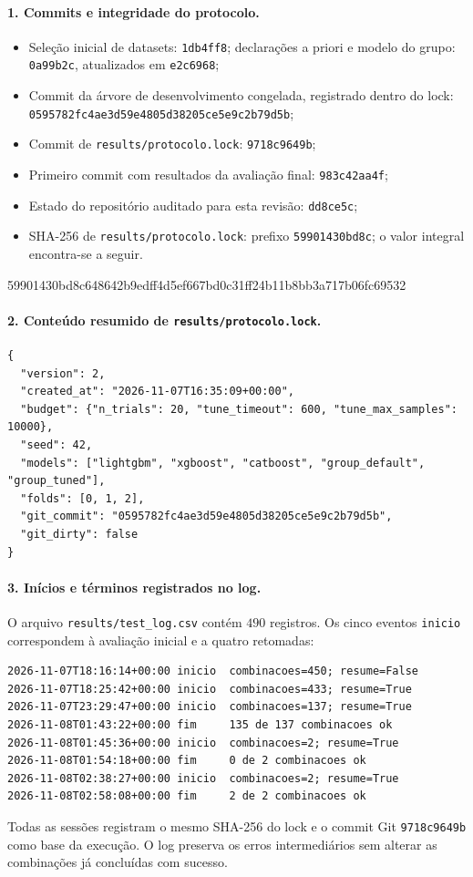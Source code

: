\documentclass[11pt,a4paper]{article}
\begin{document}
\paragraph{1. Commits e integridade do protocolo.}
\begin{itemize}[leftmargin=2em]
    \item Seleção inicial de datasets: \texttt{1db4ff8}; declarações a priori e modelo do grupo: \texttt{0a99b2c}, atualizados em \texttt{e2c6968};
    \item Commit da árvore de desenvolvimento congelada, registrado dentro do lock: \texttt{0595782fc4ae3d59e4805d38205ce5e9c2b79d5b};
    \item Commit de \texttt{results/protocolo.lock}: \texttt{9718c9649b};
    \item Primeiro commit com resultados da avaliação final: \texttt{983c42aa4f};
    \item Estado do repositório auditado para esta revisão: \texttt{dd8ce5c};
    \item SHA-256 de \texttt{results/protocolo.lock}: prefixo \texttt{59901430bd8c}; o valor integral encontra-se a seguir.
\end{itemize}
{\noindent\footnotesize\ttfamily 59901430bd8c648642b9edff4d5ef667bd0c31ff24b11b8bb3a717b06fc69532}
\paragraph{2. Conteúdo resumido de \texttt{results/protocolo.lock}.}
{\small
\begin{verbatim}
{
  "version": 2,
  "created_at": "2026-11-07T16:35:09+00:00",
  "budget": {"n_trials": 20, "tune_timeout": 600, "tune_max_samples": 10000},
  "seed": 42,
  "models": ["lightgbm", "xgboost", "catboost", "group_default", "group_tuned"],
  "folds": [0, 1, 2],
  "git_commit": "0595782fc4ae3d59e4805d38205ce5e9c2b79d5b",
  "git_dirty": false
}
\end{verbatim}
}

\paragraph{3. Inícios e términos registrados no log.}
O arquivo \texttt{results/test\_log.csv} contém $490$ registros. Os cinco eventos \texttt{inicio} correspondem à avaliação inicial e a quatro retomadas:
{\footnotesize
\begin{verbatim}
2026-11-07T18:16:14+00:00 inicio  combinacoes=450; resume=False
2026-11-07T18:25:42+00:00 inicio  combinacoes=433; resume=True
2026-11-07T23:29:47+00:00 inicio  combinacoes=137; resume=True
2026-11-08T01:43:22+00:00 fim     135 de 137 combinacoes ok
2026-11-08T01:45:36+00:00 inicio  combinacoes=2; resume=True
2026-11-08T01:54:18+00:00 fim     0 de 2 combinacoes ok
2026-11-08T02:38:27+00:00 inicio  combinacoes=2; resume=True
2026-11-08T02:58:08+00:00 fim     2 de 2 combinacoes ok
\end{verbatim}
}
Todas as sessões registram o mesmo SHA-256 do lock e o commit Git \texttt{9718c9649b} como base da execução. O log preserva os erros intermediários sem alterar as combinações já concluídas com sucesso.
\end{document}

